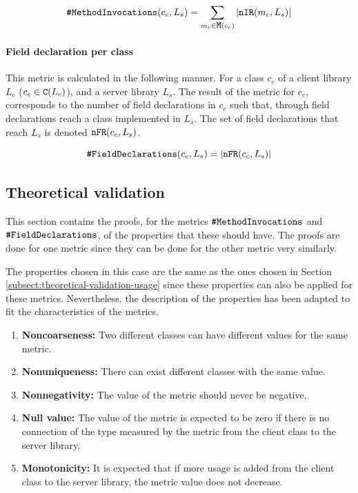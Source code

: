 \begin{equation}
\label{eqn:mi}
    \verb|#MethodInvocations|(c_c, L_s) =  \sum_{m_c \in \verb|M|(c_c)} |\verb|nIR|(m_c, L_s)|
\end{equation}

\paragraph{Field declaration per class}
This metric is calculated in the following manner. For a class $c_c$ of a client library $L_c$ ($c_c \in \verb|C|(L_c)$), and a server library $L_s$. The result of the metric for $c_c$, corresponds to the number of field declarations in $c_c$ such that, through field declarations reach a class implemented in $L_s$. The set of field declarations that reach $L_s$ is denoted $\verb|nFR|(c_c, L_s)$.

\begin{equation}
\label{eqn:fd}
    \verb|#FieldDeclarations|(c_c, L_s) = |\verb|nFR|(c_c, L_s)|
\end{equation}

\subsection{Theoretical validation}
This section contains the proofs, for the metrics $\verb|#MethodInvocations|$ and $\verb|#FieldDeclarations|$, of the properties that these should have. The proofs are done for one metric since they can be done for the other metric very similarly.

The properties chosen in this case are the same as the ones chosen in Section \ref{subsect:theoretical-validation-usage} since these properties can also be applied for these metrics. Nevertheless, the description of the properties has been adapted to fit the characteristics of the metrics.

\begin{enumerate}
  \item \textbf{Noncoarseness:} Two different classes can have different values for the same metric.
  \item \textbf{Nonuniqueness:} There can exist different classes with the same value.
  \item \textbf{Nonnegativity:} The value of the metric should never be negative.
  \item \textbf{Null value:} The value of the metric is expected to be zero if there is no connection of the type measured by the metric from the client class to the server library.
  \item \textbf{Monotonicity:} It is expected that if more usage is added from the client class to the server library, the metric value does not decrease.
\end{enumerate}

